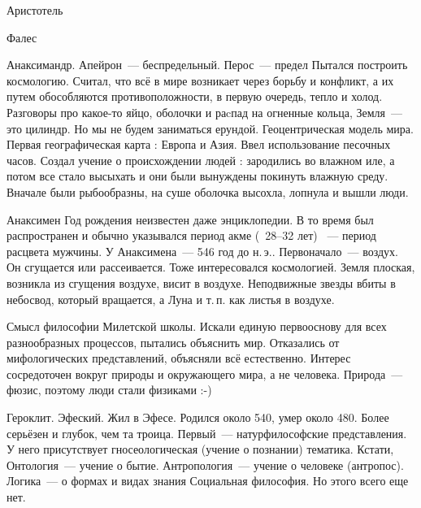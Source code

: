 
Аристотель

Фалес

Анаксимандр. 
Апейрон~--- беспредельный. Перос~--- предел
Пытался построить космологию. Считал, что всё в мире возникает через борьбу и конфликт, а их путем обособляются противоположности, в первую очередь, тепло и холод. 
Разговоры про какое-то яйцо, оболочки и раcпад на огненные кольца, Земля~--- это цилиндр. 
Но мы не будем заниматься ерундой. 
Геоцентрическая модель мира. Первая географическая карта : Европа и Азия. Ввел использование песочных часов. 
Создал учение о происхождении людей : зародились во влажном иле, а потом все стало высыхать и они были вынуждены покинуть влажную среду. Вначале были рыбообразны, на суше оболочка высохла, лопнула и вышли люди. 

Анаксимен
Год рождения неизвестен даже энциклопедии. 
В то время был распространен и обычно указывался период акме (~28--32 лет) ~--- период расцвета мужчины. 
У Анаксимена~--- 546 год до н.\,э.. 
Первоначало~--- воздух. Он сгущается или рассеивается. 
Тоже интересовался космологией. Земля плоская, возникла из сгущения воздухе, висит в воздухе. 
Неподвижные звезды вбиты в небосвод, который вращается, а Луна и т.\,п. как листья в воздухе. 

Смысл философии Милетской школы. 
Искали единую первооснову для всех разнообразных процессов, пытались объяснить мир. 
Отказались от мифологических представлений, объясняли всё естественно. 
Интерес сосредоточен вокруг природы и окружающего мира, а не человека. Природа~--- фюзис, поэтому люди стали физиками :-) 

Героклит. Эфеский.
Жил в Эфесе. Родился около 540, умер около 480. Более серьёзен и глубок, чем та троица. 
Первый~--- натурфилософские представления. У него присутствует гносеологическая (учение о познании) тематика. 
Кстати, 
Онтология~--- учение о бытие. 
Антропология~--- учение о человеке (антропос).
Логика~--- о формах и видах знания
Социальная философия. Но этого всего еще нет. 

